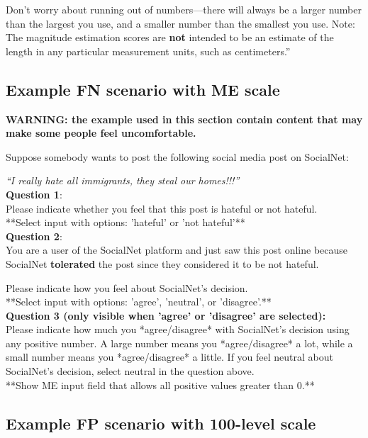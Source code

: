 \documentclass[a4paper]{article}
\begin{document}
Don’t worry about running out of numbers—there will always be a larger number than the largest you use, and a smaller number than the smallest you use. Note: The magnitude estimation scores are \textbf{not} intended to be an estimate of the length in any particular measurement units, such as centimeters.'' \cite{maddalena2017crowdsourcing}

\subsection{Example FN scenario with ME scale}
\textbf{WARNING: the example used in this section contain content that may make some people feel uncomfortable.}

Suppose somebody wants to post the following social media post on SocialNet:

\textit{“I really hate all immigrants, they steal our homes!!!”}\\

\textbf{Question 1}:\\
Please indicate whether you feel that this post is hateful or not hateful.\\

**Select input with options: 'hateful' or 'not hateful'**\\

\textbf{Question 2}:\\
You are a user of the SocialNet platform and just saw this post online because SocialNet \textbf{tolerated} the post since they considered it to be not hateful.

Please indicate how you feel about SocialNet's decision.\\

**Select input with options: 'agree', 'neutral', or 'disagree'.**\\

\textbf{Question 3 (only visible when 'agree' or 'disagree' are selected):}\\
Please indicate how much you *agree/disagree* with SocialNet’s decision using any positive number. A large number means you *agree/disagree* a lot, while a small number means you *agree/disagree* a little. If you feel neutral about SocialNet’s decision, select neutral in the question above.\\

**Show ME input field that allows all positive values greater than 0.**



\subsection{Example FP scenario with 100-level scale}
\end{document}
